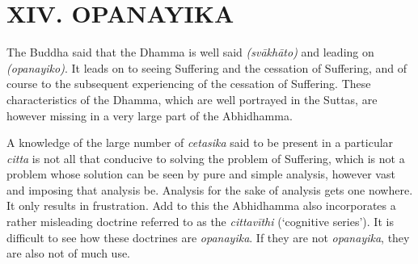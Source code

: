 \section{XIV. OPANAYIKA}

The Buddha said that the Dhamma is well said \emph{(svākhāto)} and leading on \emph{(opanayiko)}. It leads on to seeing Suffering and the cessation of Suffering, and of course to the subsequent experiencing of the cessation of Suffering. These characteristics of the Dhamma, which are well portrayed in the Suttas, are however missing in a very large part of the Abhidhamma.

A knowledge of the large number of \emph{cetasika} said to be present in a particular \emph{citta} is not all that conducive to solving the problem of Suffering, which is not a problem whose solution can be seen by pure and simple analysis, however vast and imposing that analysis be. Analysis for the sake of analysis gets one nowhere. It only results in frustration. Add to this the Abhidhamma also incorporates a rather misleading doctrine referred to as the \emph{cittavīthi} (`cognitive series'). It is difficult to see how these doctrines are \emph{opanayika}. If they are not \emph{opanayika}, they are also not of much use.
